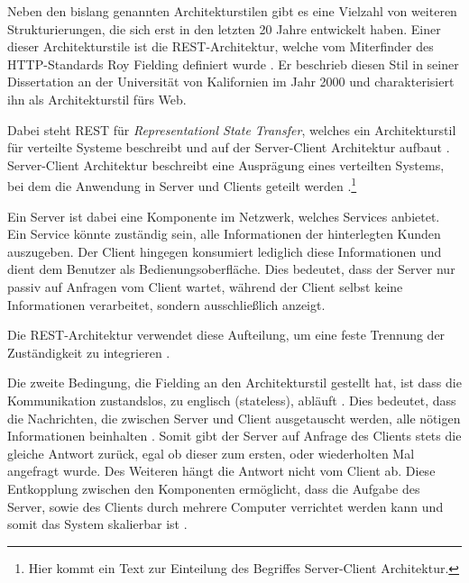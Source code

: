 Neben den bislang genannten Architekturstilen gibt es eine Vielzahl von weiteren Strukturierungen, die sich erst in den letzten 20 Jahre entwickelt haben. Einer dieser Architekturstile ist die REST-Architektur, welche vom Miterfinder des HTTP-Standards Roy Fielding definiert wurde \parencite[][S. 128]{starke_effektive_2015}. Er beschrieb diesen Stil in seiner Dissertation an der Universität von Kalifornien im Jahr 2000 und charakterisiert ihn als Architekturstil fürs Web.

Dabei steht REST für \textit{Representationl State Transfer}, welches ein Architekturstil für verteilte Systeme beschreibt und auf der Server-Client Architektur aufbaut \parencite[][S. 76]{fielding_architectural_2000}. Server-Client Architektur beschreibt eine Ausprägung eines verteilten Systems, bei dem die Anwendung in Server und Clients geteilt werden \parencite[][S. 117]{starke_effektive_2015}.\footnote{Hier kommt ein Text zur Einteilung des Begriffes Server-Client Architektur.}


Ein Server ist dabei eine Komponente im Netzwerk, welches Services anbietet. Ein Service könnte zuständig sein, alle Informationen der hinterlegten Kunden auszugeben. Der Client hingegen konsumiert lediglich diese Informationen und dient dem Benutzer als Bedienungsoberfläche. Dies bedeutet, dass der Server nur passiv auf Anfragen vom Client wartet, während der Client selbst keine Informationen verarbeitet, sondern ausschließlich anzeigt.

Die REST-Architektur verwendet diese Aufteilung, um eine feste Trennung der Zuständigkeit zu integrieren \parencite[vgl.][S. 78]{fielding_architectural_2000}.

Die zweite Bedingung, die Fielding an den Architekturstil gestellt hat, ist dass die Kommunikation zustandslos, zu englisch (stateless), abläuft \parencite[][S. 78]{fielding_architectural_2000}. Dies bedeutet, dass die Nachrichten, die zwischen Server und Client ausgetauscht werden, alle nötigen Informationen beinhalten \parencite[][S. 128]{starke_effektive_2015}. Somit gibt der Server auf Anfrage des Clients stets die gleiche Antwort zurück, egal ob dieser zum ersten, oder wiederholten Mal angefragt wurde. Des Weiteren hängt die Antwort nicht vom Client ab.
Diese Entkopplung zwischen den Komponenten ermöglicht, dass die Aufgabe des Server, sowie des Clients durch mehrere Computer verrichtet werden kann und somit das System skalierbar ist \parencite[][S. 79]{fielding_architectural_2000}.

